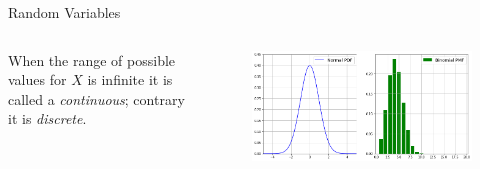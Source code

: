 \documentclass{beamer}
\begin{document}
\begin{frame}{Random Variables}
    \begin{columns}
    When the range of possible values for $X$ is infinite it is called a \emph{continuous}; contrary it is \emph{discrete}.
    \begin{figure}[h]
    \begin{center}
    \includegraphics[width=1.0\linewidth]{rv_pdf}
    \end{center}
    \end{figure}    
    \end{columns}
\end{frame}
\end{document}
